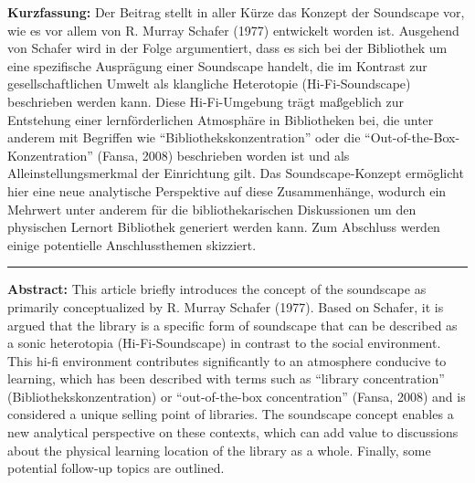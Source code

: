 \textbf{Kurzfassung:} Der Beitrag stellt in aller Kürze das Konzept der
Soundscape vor, wie es vor allem von R. Murray Schafer (1977) entwickelt
worden ist. Ausgehend von Schafer wird in der Folge argumentiert, dass
es sich bei der Bibliothek um eine spezifische Ausprägung einer
Soundscape handelt, die im Kontrast zur gesellschaftlichen Umwelt als
klangliche Heterotopie (Hi-Fi-Soundscape) beschrieben werden kann. Diese
Hi-Fi-Umgebung trägt maßgeblich zur Entstehung einer lernförderlichen
Atmosphäre in Bibliotheken bei, die unter anderem mit Begriffen wie
\enquote{Bibliothekskonzentration} oder die \enquote{Out-of-the-Box-Konzentration}
(Fansa, 2008) beschrieben worden ist und als Alleinstellungsmerkmal der
Einrichtung gilt. Das Soundscape-Konzept ermöglicht hier eine neue
analytische Perspektive auf diese Zusammenhänge, wodurch ein Mehrwert
unter anderem für die bibliothekarischen Diskussionen um den physischen
Lernort Bibliothek generiert werden kann. Zum Abschluss werden einige
potentielle Anschlussthemen skizziert.

\begin{center}\rule{0.5\linewidth}{0.5pt}\end{center}

\textbf{Abstract:} This article briefly introduces the concept of the
soundscape as primarily conceptualized by R. Murray Schafer (1977).
Based on Schafer, it is argued that the library is a specific form of
soundscape that can be described as a sonic heterotopia
(Hi-Fi-Soundscape) in contrast to the social environment. This hi-fi
environment contributes significantly to an atmosphere conducive to
learning, which has been described with terms such as \enquote{library
concentration} (Bibliothekskonzentration) or \enquote{out-of-the-box
concentration} (Fansa, 2008) and is considered a unique selling point
of libraries. The soundscape concept enables a new analytical
perspective on these contexts, which can add value to discussions about
the physical learning location of the library as a whole. Finally, some
potential follow-up topics are outlined.